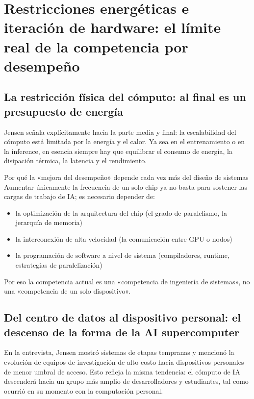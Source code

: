 \section{Restricciones energéticas e iteración de hardware: el límite real de la competencia por desempeño}

\subsection{La restricción física del cómputo: al final es un presupuesto de energía}

Jensen señala explícitamente hacia la parte media y final: la escalabilidad del cómputo está limitada por la energía y el calor. Ya sea en el entrenamiento o en la inference, en esencia siempre hay que equilibrar el consumo de energía, la disipación térmica, la latencia y el rendimiento.

\begin{knowledgebox}{Por qué la «mejora del desempeño» depende cada vez más del diseño de sistemas}
Aumentar únicamente la frecuencia de un solo chip ya no basta para sostener las cargas de trabajo de IA; es necesario depender de:
\begin{itemize}
    \item la optimización de la arquitectura del chip (el grado de paralelismo, la jerarquía de memoria)
    \item la interconexión de alta velocidad (la comunicación entre GPU o nodos)
    \item la programación de software a nivel de sistema (compiladores, runtime, estrategias de paralelización)
\end{itemize}
Por eso la competencia actual es una «competencia de ingeniería de sistemas», no una «competencia de un solo dispositivo».
\end{knowledgebox}

\subsection{Del centro de datos al dispositivo personal: el descenso de la forma de la AI supercomputer}

En la entrevista, Jensen mostró sistemas de etapas tempranas y mencionó la evolución de equipos de investigación de alto costo hacia dispositivos personales de menor umbral de acceso. Esto refleja la misma tendencia: el cómputo de IA descenderá hacia un grupo más amplio de desarrolladores y estudiantes, tal como ocurrió en su momento con la computación personal.

